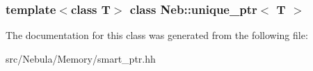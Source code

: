 \subsubsection*{template$<$class \-T$>$ class Neb\-::unique\-\_\-ptr$<$ T $>$}



\-The documentation for this class was generated from the following file\-:\begin{DoxyCompactItemize}
\item 
src/\-Nebula/\-Memory/smart\-\_\-ptr.\-hh\end{DoxyCompactItemize}
